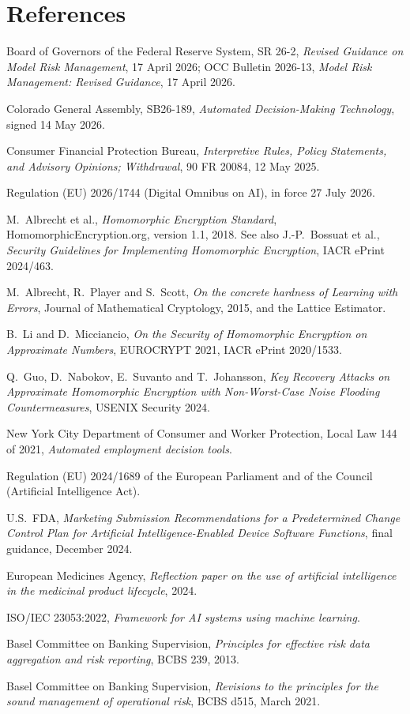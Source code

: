 \documentclass[10pt,a4paper]{article}
\begin{document}
\section*{References}
\small
\begin{enumerate}[label={[\arabic*]},leftmargin=*,itemsep=1pt]
  \item Board of Governors of the Federal Reserve System, SR 26-2, \textit{Revised Guidance on Model Risk Management}, 17 April 2026; OCC Bulletin 2026-13, \textit{Model Risk Management: Revised Guidance}, 17 April 2026.
  \item Colorado General Assembly, SB26-189, \textit{Automated Decision-Making Technology}, signed 14 May 2026.
  \item Consumer Financial Protection Bureau, \textit{Interpretive Rules, Policy Statements, and Advisory Opinions; Withdrawal}, 90 FR 20084, 12 May 2025.
  \item Regulation (EU) 2026/1744 (Digital Omnibus on AI), in force 27 July 2026.
  \item M.~Albrecht et al., \textit{Homomorphic Encryption Standard}, HomomorphicEncryption.org, version 1.1, 2018. See also J.-P.~Bossuat et al., \textit{Security Guidelines for Implementing Homomorphic Encryption}, IACR ePrint 2024/463.
  \item M.~Albrecht, R.~Player and S.~Scott, \textit{On the concrete hardness of Learning with Errors}, Journal of Mathematical Cryptology, 2015, and the Lattice Estimator.
  \item B.~Li and D.~Micciancio, \textit{On the Security of Homomorphic Encryption on Approximate Numbers}, EUROCRYPT 2021, IACR ePrint 2020/1533.
  \item Q.~Guo, D.~Nabokov, E.~Suvanto and T.~Johansson, \textit{Key Recovery Attacks on Approximate Homomorphic Encryption with Non-Worst-Case Noise Flooding Countermeasures}, USENIX Security 2024.
  \item New York City Department of Consumer and Worker Protection, Local Law 144 of 2021, \textit{Automated employment decision tools}.
  \item Regulation (EU) 2024/1689 of the European Parliament and of the Council (Artificial Intelligence Act).
  \item U.S.\ FDA, \textit{Marketing Submission Recommendations for a Predetermined Change Control Plan for Artificial Intelligence-Enabled Device Software Functions}, final guidance, December 2024.
  \item European Medicines Agency, \textit{Reflection paper on the use of artificial intelligence in the medicinal product lifecycle}, 2024.
  \item ISO/IEC 23053:2022, \textit{Framework for AI systems using machine learning}.
  \item Basel Committee on Banking Supervision, \textit{Principles for effective risk data aggregation and risk reporting}, BCBS 239, 2013.
  \item Basel Committee on Banking Supervision, \textit{Revisions to the principles for the sound management of operational risk}, BCBS d515, March 2021.
\end{enumerate}
\normalsize
\end{document}
